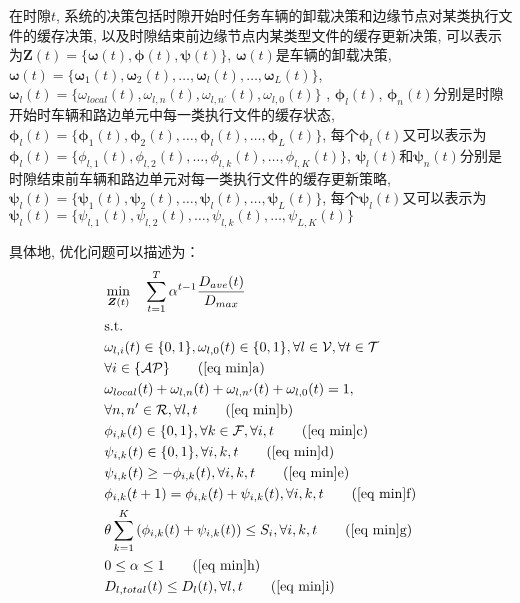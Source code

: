 \documentclass[lettersize,journal]{IEEEtran}
\begin{document}
{{在时隙$ t $, 系统的决策包括时隙开始时任务车辆的卸载决策和边缘节点对某类执行文件的缓存决策, 以及时隙结束前边缘节点内某类型文件的缓存更新决策, 可以表示为$ \boldsymbol{Z}(t)=\{ \boldsymbol{\omega}(t) ,\boldsymbol{\phi}(t), \boldsymbol{\psi}(t) \}  $, $ \boldsymbol{\omega}(t) $是车辆的卸载决策, $ \boldsymbol{\omega}(t)=\{ \boldsymbol{\omega}_{1}(t), \boldsymbol{\omega}_{2}(t),\dots, \boldsymbol{\omega}_l(t),\dots ,\boldsymbol{\omega}_{L}(t) \} $, $ \boldsymbol{\omega}_l(t)=\{ \omega_{local}(t),\omega_{l,n}(t),\omega_{l,n^{\prime}}(t),\omega_{l,0}(t) \} $ , $\boldsymbol{\phi}_l(t)$, $ \boldsymbol{\phi}_n(t) $分别是时隙开始时车辆和路边单元中每一类执行文件的缓存状态, $ \boldsymbol{\phi}_l(t)=\{ \boldsymbol{\phi}_1(t), \boldsymbol{\phi}_2(t),\dots,\boldsymbol{\phi}_l(t) , \dots, \boldsymbol{\phi}_L(t) \} $, 每个$ \boldsymbol{\phi}_l(t) $又可以表示为$  \boldsymbol{\phi}_l(t)=\{ \phi_{l,1}(t), \phi_{l,2}(t),\dots,\phi_{l,k}(t),\dots,\phi_{l,K}(t) \}  $,
$ \boldsymbol{\psi}_l(t) $和$ \boldsymbol{\psi}_n(t) $分别是时隙结束前车辆和路边单元对每一类执行文件的缓存更新策略, $ \boldsymbol{\psi}_l(t)=\{ \boldsymbol{\psi}_1(t), \boldsymbol{\psi}_2(t), \dots,\boldsymbol{\psi}_l(t) ,\dots,\boldsymbol{\psi}_L(t) \} $, 每个$ \boldsymbol{\psi}_l(t) $又可以表示为$  \boldsymbol{\psi}_l(t)=\{ \psi_{l,1}(t), \psi_{l,2}(t),\dots,\psi_{l,k}(t),\dots,\psi_{L,K}(t) \}  $

具体地, 优化问题可以描述为：
\begin{align}
	&\min_{\boldsymbol{Z}(t)} \quad \sum_{t=1}^{T}\alpha^{t-1}\frac{D_{ave}(t)}{D_{max}} \label{eq min}\\
	&\text{s.t.}  \notag \\
	& \omega_{l,i}(t) \in \{ 0,1 \}, \omega_{l,0}(t) \in \{0,1\}, \forall l\in \mathcal{V},\forall t\in \mathcal{T} \notag \\
	&\forall i \in \{\mathcal{AP}\}  \tag{\ref{eq min}a} \label{offload decision a} \\
	&\omega_{local}(t)+\omega_{l,n}(t)+\omega_{l,n^{\prime}}(t)+\omega_{l,0}(t)=1, \notag \\
	& \forall n,n^\prime\in \mathcal{R}, \forall l,t  \tag{\ref{eq min}b} \label{offload decision sum b} \\
	& \phi_{i,k}(t)\in \{0,1\}, \forall k\in \mathcal{F}, \forall i,t \label{cache decision c} \tag{\ref{eq min}c} \\
	& \psi_{i,k}(t) \in \{0,1\} , \forall i,k,t \label{cache update decision d} \tag{\ref{eq min}d} \\
	& \psi_{i,k}(t) \geq -\phi_{i,k}(t), \forall i,k,t \label{cache decision geq update decision e} \tag{\ref{eq min}e} \\
	& \phi_{i,k}(t+1)=\phi_{i,k}(t)+\psi_{i,k}(t), \forall i,k,t \label{get cache decision f } \tag{\ref{eq min}f} \\
	& \theta \sum_{k=1}^{K}{( \phi_{i,k}(t)+\psi_{i,k}(t) )} \leq S_i, \forall i,k,t \label{storage constraint g} \tag{\ref{eq min}g} \\
	& 0\le \alpha \le 1 \label{discount factor h} \tag{\ref{eq min}h} \\
	& D_{l,total}(t) \le D_l(t),\forall l,t \label{task delay constraint i} \tag{\ref{eq min}i}
\end{align}

}}
\end{document}
